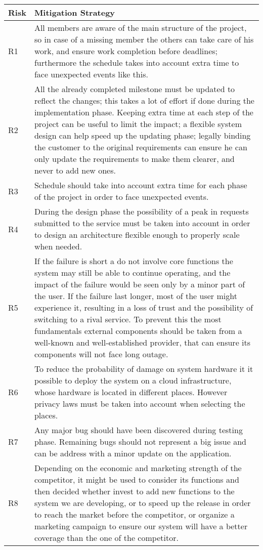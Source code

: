 \noindent
\begin{tabular}{| l | p{13cm}  |}
\hline
\textbf{Risk} & \textbf{Mitigation Strategy}\\
\hline
R1 & All members are aware of the main structure of the project, so in case of a missing member the others can take care of his work, and ensure work completion before deadlines; furthermore the schedule takes into account extra time to face unexpected events like this.\\
\hline
R2 & All the already completed milestone must be updated to reflect the changes; this takes a lot of effort if done during the implementation phase. Keeping extra time at each step of the project can be useful to limit the impact; a flexible system design can help speed up the updating phase; legally binding the customer to the original requirements can ensure he can only update the requirements to make them clearer, and never to add new ones.\\
\hline
R3 & Schedule should take into account extra time for each phase of the project in order to face unexpected events.\\
\hline
R4 & During the design phase the possibility of a peak in requests submitted to the service must be taken into account in order to design an architecture flexible enough to properly scale when needed.\\
\hline
R5 & If the failure is short a do not involve core functions the system may still be able to continue operating, and the impact of the failure would be seen only by a minor part of the user. If the failure last longer, most of the user might experience it, resulting in a loss of trust and the possibility of switching to a rival service. To prevent this the most fundamentals external components should be taken from a well-known and well-established provider, that can ensure its components will not face long outage.\\
\hline
R6 & To reduce the probability of damage on system hardware it it possible to deploy the system on a cloud infrastructure, whose hardware is located in different places. However privacy laws must be taken into account when selecting the places.\\
\hline
R7 & Any major bug should have been discovered during testing phase. Remaining bugs should not represent a big issue and can be address with a minor update on the application.\\
\hline
R8 & Depending on the economic and marketing strength of the competitor, it might be used to consider its functions and then decided whether invest to add new functions to the system we are developing, or to speed up the release in order to reach the market before the competitor, or organize a marketing campaign to ensure our system will have a better coverage than the one of the competitor.\\

\end{tabular}
